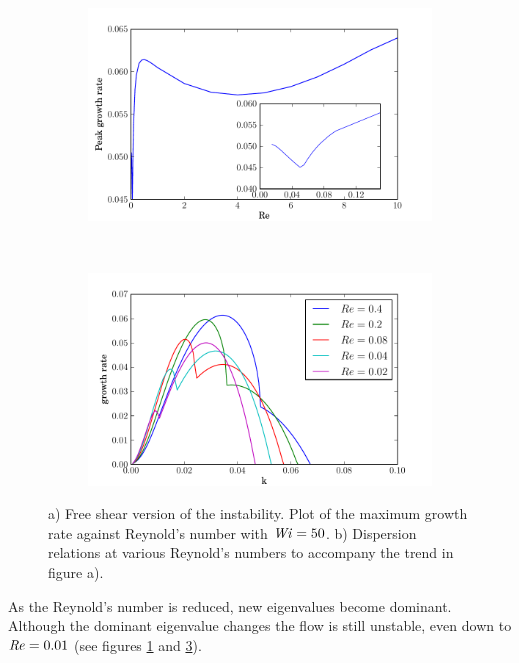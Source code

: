 \documentclass{jfm}
\newcommand\Wi{\mbox{\textit{Wi}}}
\newcommand\Rey{\mbox{\textit{Re}}}  %
\begin{document}
\begin{figure}
    \centering
    \begin{subfigure}[b]{0.48\textwidth}
	\centering
	\includegraphics[width=\textwidth]{inf_vary_Re}
	\caption{}
	\label{fig:inf_vary_Re}
    \end{subfigure}
    ~
    \begin{subfigure}[b]{0.48\textwidth}
	\centering
	\includegraphics[width=\textwidth]{inf_dispersions_low_Wi}
	\caption{}
	\label{fig:dispersions_low_Wi}
    \end{subfigure}
    \caption{a) Free shear version of the instability. Plot of the maximum growth rate against Reynold's number with $\Wi=50$. b) Dispersion relations at various Reynold's numbers to accompany the trend in figure a).}
\end{figure}

As the Reynold's number is reduced, new eigenvalues become dominant. Although the dominant eigenvalue changes the flow is still unstable, even down to $\Rey = 0.01$ (see figures \ref{fig:inf_vary_Re} and \ref{fig:dispersions_low_Wi}).
\end{document}
